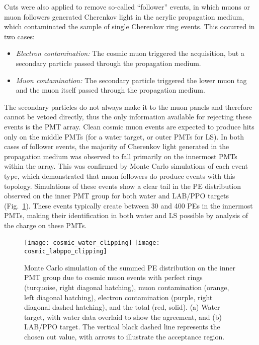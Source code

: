Cuts were also applied to remove so-called ``follower'' events, in which muons or muon followers generated Cherenkov light in the acrylic propagation medium, which contaminated the sample of single Cherenkov ring events.  This occurred in two cases: 
\begin{itemize}
\item \emph{Electron contamination:} The cosmic muon triggered the acquisition, but a secondary particle passed through the propagation medium.
\item \emph{Muon contamination:} The secondary particle triggered the lower muon tag and the muon itself passed through the propagation medium.  
\end{itemize}
The secondary particles do not always make it to the muon panels and therefore cannot be vetoed directly, thus the only information available for rejecting these events is the PMT array.  
Clean cosmic muon events are expected to produce hits only on the middle PMTs (for a water target, or outer PMTs for LS).
In both cases of follower events, the majority of Cherenkov light generated in the propagation medium was observed 
to fall primarily on the innermost PMTs within the array.  This was confirmed by Monte Carlo simulations of each event type, which 
demonstrated that muon followers do produce events with this topology.   
Simulations of these events show a clear tail in the PE distribution observed on the inner PMT group for both water and LAB/PPO targets (Fig.~\ref{f:clipMC}).  
These events 
typically create between 30 and 400 PEs in the innermost PMTs, making their identification in both water and LS possible by analysis of the charge on these PMTs.  

\begin{figure}
\centering
\texttt{[image: cosmic\_water\_clipping]}
\texttt{[image: cosmic\_labppo\_clipping]}
\caption{ Monte Carlo simulation of the summed PE distribution on the inner PMT group due to cosmic muon events with perfect rings (turquoise, right diagonal hatching), muon contamination (orange, left diagonal hatching), electron contamination (purple, right diagonal dashed hatching), and the total (red, solid).  (a) Water target, with water data overlaid to show the agreement, and (b) LAB/PPO target.  The vertical black dashed line represents the chosen cut value, with arrows to illustrate the acceptance region.}
\label{f:clipMC}
\end{figure}

